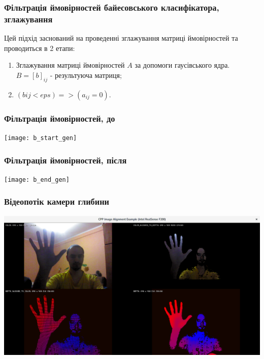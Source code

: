 \begin{frame}
	\manimate
	\frametitle{Фільтрація ймовірностей байесовського класифікатора, зглажування}
	Цей підхід заснований на проведенні зглажування матриці ймовірностей та проводиться в 2 етапи:
	\begin{enumerate}
		\item Зглажування матриці ймовірностей $A$ за допомоги гаусівського ядра. $B = [b]_{ij}$ - результуюча матриця;
		\item $ (b{ij} < eps) => (a_{ij} = 0)$.
	\end{enumerate}
\end{frame}

\begin{frame}
	\manimate
	\frametitle{Фільтрація ймовірностей, до}
	\texttt{[image: b\_start\_gen]}
\end{frame}

\begin{frame}
	\manimate
	\frametitle{Фільтрація ймовірностей, після}
	\texttt{[image: b\_end\_gen]}
\end{frame}

\begin{frame}
	\manimate
	\frametitle{Відеопотік камери глибини}
	\includegraphics[width=1.0\linewidth]{im/depth_camera}
\end{frame}